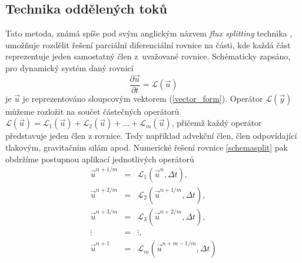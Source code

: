 \subsection{Technika oddělených toků}
\label{technikaodd}
Tato metoda, známá spíše pod svým anglickým názvem {\it flux splitting} technika \citep[stránka 415]{Hirsch2002}, umožňuje rozdělit řešení parciální diferenciální rovnice na části, kde každá část reprezentuje jeden samostatný člen z~uvažované rovnice. Schématicky zapsáno, pro dynamický systém daný rovnicí
\begin{equation}
\frac{\partial \vec{u}}{\partial t}=\mathcal{L}(\vec{u})
\label{schemasplit}
\end  {equation}
je $\vec{u}$  je reprezentováno sloupcovým vektorem (\ref{vector_form}). Operátor $\mathcal{L}(\vec{y})$ můžeme rozložit na součet částečných operátorů $\mathcal{L}(\vec{u})=\mathcal{L}_1(\vec{u})+\mathcal{L}_2(\vec{u})+\dots +\mathcal{L}_m(\vec{u})$, přičemž každý operátor představuje jeden člen z rovnice. Tedy například advekční člen, člen odpovídající tlakovým, gravitačním silám apod. Numerické řešení rovnice \eqref{schemasplit} pak obdržíme postupnou aplikací jednotlivých operátorů 
\begin{eqnarray}
\vec{u}^{n+1/m} &=&\mathcal{L}_1(\vec{u}^n,\Delta{t}), \\
\nonumber \vec{u}^{n+2/m} &=&\mathcal{L}_2(\vec{u}^{n+1/m},\Delta{t}), \\
\nonumber \vec{u}^{n+3/m} &=&\mathcal{L}_3(\vec{u}^{n+2/m},\Delta{t}), \\
\nonumber \vdots &=&\vdots, \\
\nonumber \vec{u}^{n+1} &=&\mathcal{L}_m(\vec{u}^{n+m-1/m},\Delta{t})
\end{eqnarray}

